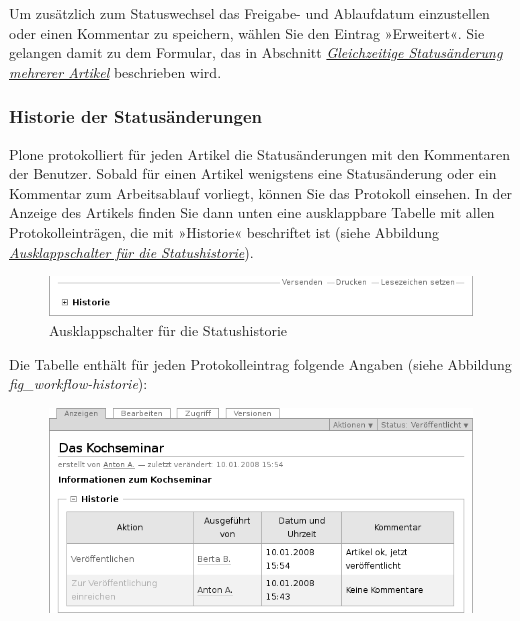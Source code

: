 \documentclass[a4paper,12pt,ngerman]{manual}
\begin{document}
Um zusätzlich zum Statuswechsel das Freigabe- und Ablaufdatum einzustellen
oder einen Kommentar zu speichern, wählen Sie den Eintrag »Erweitert«. Sie
gelangen damit zu dem Formular, das in Abschnitt \hyperlink{sec-batch-publishing}{\emph{Gleichzeitige Statusänderung mehrerer Artikel}}
beschrieben wird.


\subsubsection{Historie der Statusänderungen}

Plone protokolliert für jeden Artikel die Statusänderungen mit den Kommentaren
der Benutzer. Sobald für einen Artikel wenigstens eine Statusänderung oder ein
Kommentar zum Arbeitsablauf vorliegt, können Sie das Protokoll einsehen. In
der Anzeige des Artikels finden Sie dann unten eine ausklappbare Tabelle mit
allen Protokolleinträgen, die mit »Historie« beschriftet ist
(siehe Abbildung \hyperlink{fig-workflow-historie-eingeklappt}{\emph{Ausklappschalter für die Statushistorie}}).
\hypertarget{fig-workflow-historie-eingeklappt}{}\begin{figure}[htbp]
\centering

\includegraphics{workflow-historie-eingeklappt.png}
\caption{Ausklappschalter für die Statushistorie}\end{figure}

Die Tabelle enthält für jeden Protokolleintrag folgende Angaben (siehe
Abbildung \emph{fig\_workflow-historie}):
\hypertarget{fig-workflow-historie}{}\begin{figure}[htbp]
\centering

\includegraphics{workflow-historie.png}
\end{figure}
\end{document}
